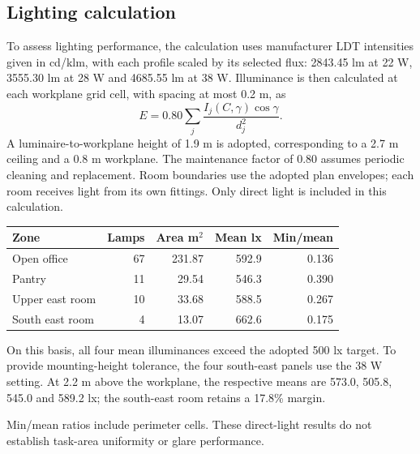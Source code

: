 \subsection*{Lighting calculation}
To assess lighting performance, the calculation uses manufacturer LDT intensities given in cd/klm, with each profile scaled by its selected flux: 2843.45 lm at 22 W, 3555.30 lm at 28 W and 4685.55 lm at 38 W. Illuminance is then calculated at each workplane grid cell, with spacing at most 0.2 m, as
\[
E=0.80\sum_j\frac{I_j(C,\gamma)\cos\gamma}{d_j^2}.
\]
A luminaire-to-workplane height of 1.9 m is adopted, corresponding to a 2.7 m ceiling and a 0.8 m workplane. The maintenance factor of 0.80 assumes periodic cleaning and replacement. Room boundaries use the adopted plan envelopes; each room receives light from its own fittings. Only direct light is included in this calculation.
\begin{center}\begin{tabular}{lrrrr}\toprule
Zone & Lamps & Area m$^2$ & Mean lx & Min/mean\\\midrule
Open office & 67 & 231.87 & 592.9 & 0.136\\
Pantry & 11 & 29.54 & 546.3 & 0.390\\
Upper east room & 10 & 33.68 & 588.5 & 0.267\\
South east room & 4 & 13.07 & 662.6 & 0.175\\
\bottomrule\end{tabular}\end{center}
On this basis, all four mean illuminances exceed the adopted 500 lx target. To provide mounting-height tolerance, the four south-east panels use the 38 W setting. At 2.2 m above the workplane, the respective means are 573.0, 505.8, 545.0 and 589.2 lx; the south-east room retains a 17.8\% margin.

Min/mean ratios include perimeter cells. These direct-light results do not establish task-area uniformity or glare performance.
